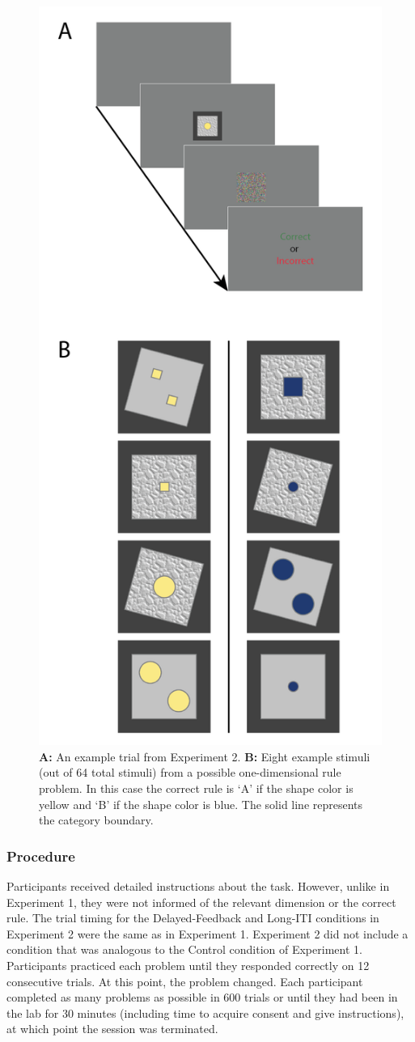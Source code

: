 \documentclass[doc, floatsintext]{apa7}
\begin{document}
\begin{figure}
  \centering
  \includegraphics[width=.5\textwidth]{../figures/fig_design_exp_2.png}
  \caption{
      \textbf{A:} An example trial from Experiment 2.
      \textbf{B:} Eight example stimuli (out of 64 total
      stimuli) from a possible one-dimensional rule problem.
      In this case the correct rule is `A' if the shape
      color is yellow and `B' if the shape color is blue.
      The solid line represents the category boundary.
}
  \label{fig_design_exp_2}
\end{figure}

\subsubsection{Procedure}
Participants received detailed instructions about the task.
However, unlike in Experiment 1, they were not informed of
the relevant dimension or the correct rule. The trial timing
for the Delayed-Feedback and Long-ITI conditions in
Experiment 2 were the same as in Experiment 1. Experiment 2
did not include a condition that was analogous to the
Control condition of Experiment 1. Participants practiced
each problem until they responded correctly on 12
consecutive trials. At this point, the problem changed. Each
participant completed as many problems as possible in 600
trials or until they had been in the lab for 30 minutes
(including time to acquire consent and give instructions),
at which point the session was terminated.
\end{document}
